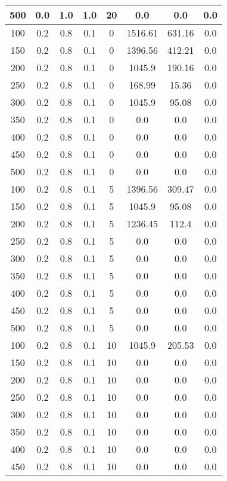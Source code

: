 \documentclass[a4paper, 12pt]{extreport}
\begin{document}
\begin{itemize}
\begin{longtable}{|c|c|c|c|c|c|c|c|}
			500 & 0.0 & 1.0 & 1.0 & 20 & 0.0 & 0.0 & 0.0 \\\hline
			100 & 0.2 & 0.8 & 0.1 & 0 & 1516.61 & 631.16 & 0.0 \\\hline
			150 & 0.2 & 0.8 & 0.1 & 0 & 1396.56 & 412.21 & 0.0 \\\hline
			200 & 0.2 & 0.8 & 0.1 & 0 & 1045.9 & 190.16 & 0.0 \\\hline
			250 & 0.2 & 0.8 & 0.1 & 0 & 168.99 & 15.36 & 0.0 \\\hline
			300 & 0.2 & 0.8 & 0.1 & 0 & 1045.9 & 95.08 & 0.0 \\\hline
			350 & 0.2 & 0.8 & 0.1 & 0 & 0.0 & 0.0 & 0.0 \\\hline
			400 & 0.2 & 0.8 & 0.1 & 0 & 0.0 & 0.0 & 0.0 \\\hline
			450 & 0.2 & 0.8 & 0.1 & 0 & 0.0 & 0.0 & 0.0 \\\hline
			500 & 0.2 & 0.8 & 0.1 & 0 & 0.0 & 0.0 & 0.0 \\\hline
			100 & 0.2 & 0.8 & 0.1 & 5 & 1396.56 & 309.47 & 0.0 \\\hline
			150 & 0.2 & 0.8 & 0.1 & 5 & 1045.9 & 95.08 & 0.0 \\\hline
			200 & 0.2 & 0.8 & 0.1 & 5 & 1236.45 & 112.4 & 0.0 \\\hline
			250 & 0.2 & 0.8 & 0.1 & 5 & 0.0 & 0.0 & 0.0 \\\hline
			300 & 0.2 & 0.8 & 0.1 & 5 & 0.0 & 0.0 & 0.0 \\\hline
			350 & 0.2 & 0.8 & 0.1 & 5 & 0.0 & 0.0 & 0.0 \\\hline
			400 & 0.2 & 0.8 & 0.1 & 5 & 0.0 & 0.0 & 0.0 \\\hline
			450 & 0.2 & 0.8 & 0.1 & 5 & 0.0 & 0.0 & 0.0 \\\hline
			500 & 0.2 & 0.8 & 0.1 & 5 & 0.0 & 0.0 & 0.0 \\\hline
			100 & 0.2 & 0.8 & 0.1 & 10 & 1045.9 & 205.53 & 0.0 \\\hline
			150 & 0.2 & 0.8 & 0.1 & 10 & 0.0 & 0.0 & 0.0 \\\hline
			200 & 0.2 & 0.8 & 0.1 & 10 & 0.0 & 0.0 & 0.0 \\\hline
			250 & 0.2 & 0.8 & 0.1 & 10 & 0.0 & 0.0 & 0.0 \\\hline
			300 & 0.2 & 0.8 & 0.1 & 10 & 0.0 & 0.0 & 0.0 \\\hline
			350 & 0.2 & 0.8 & 0.1 & 10 & 0.0 & 0.0 & 0.0 \\\hline
			400 & 0.2 & 0.8 & 0.1 & 10 & 0.0 & 0.0 & 0.0 \\\hline
			450 & 0.2 & 0.8 & 0.1 & 10 & 0.0 & 0.0 & 0.0 \\\hline

\end{longtable}
\end{itemize}
\end{document}
